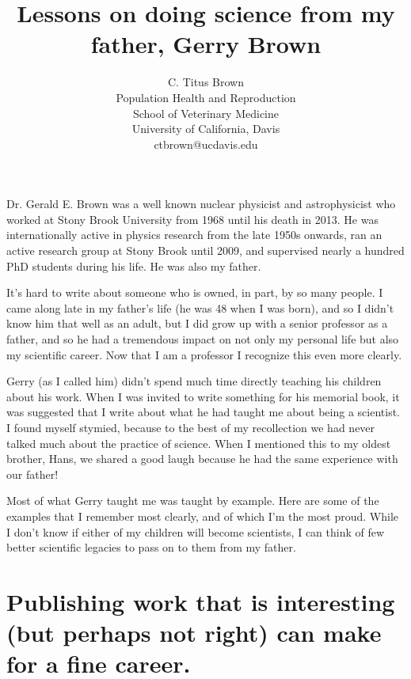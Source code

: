 


\title{Lessons on doing science from my father, Gerry Brown}
\author{C. Titus Brown\\
  Population Health and Reproduction\\
  School of Veterinary Medicine\\
  University of California, Davis\\
  ctbrown@ucdavis.edu}
\maketitle



Dr. Gerald E. Brown was a well known nuclear physicist and
astrophysicist who worked at Stony Brook University from 1968 until
his death in 2013. He was internationally active in physics research
from the late 1950s onwards, ran an active research group at Stony
Brook until 2009, and supervised nearly a hundred PhD students during
his life. He was also my father.

It's hard to write about someone who is owned, in part, by so many
people. I came along late in my father's life (he was 48 when I was
born), and so I didn't know him that well as an adult, but I did grow
up with a senior professor as a father, and so he had a tremendous
impact on not only my personal life but also my scientific career. Now
that I am a professor I recognize this even more clearly.

Gerry (as I called him) didn't spend much time directly teaching his
children about his work.  When I was invited to write something for
his memorial book, it was suggested that I write about what he had
taught me about being a scientist. I found myself stymied, because to
the best of my recollection we had never talked much about the
practice of science. When I mentioned this to my oldest brother, Hans,
we shared a good laugh because he had the same experience with our
father!

Most of what Gerry taught me was taught by example. Here are
some of the examples that I remember most clearly, and of which I'm
the most proud. While I don't know if either of my children will
become scientists, I can think of few better scientific legacies to
pass on to them from my father.

\section*{Publishing work that is interesting (but perhaps not right) can make
for a fine career.}

